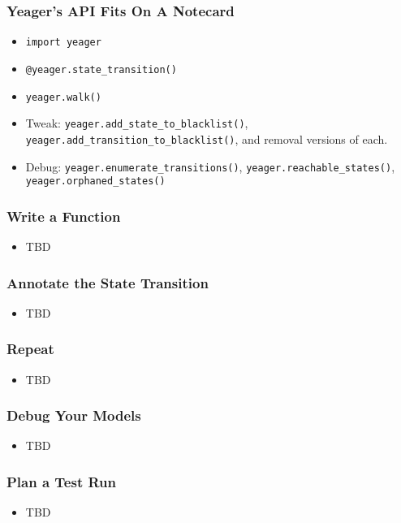 \begin{frame}
  \frametitle{Yeager's API Fits On A Notecard}
  \begin{itemize}
    \item \texttt{import yeager}
    \item \texttt{@yeager.state\_transition()}
    \item \texttt{yeager.walk()}
    \item Tweak: \texttt{yeager.add\_state\_to\_blacklist()}, \texttt{yeager.add\_transition\_to\_blacklist()}, and removal versions of each.
    \item Debug: \texttt{yeager.enumerate\_transitions()}, \texttt{yeager.reachable\_states()}, \texttt{yeager.orphaned\_states()}
  \end{itemize}
\end{frame}

\begin{frame}
  \frametitle{Write a Function}
  \begin{itemize}
    \item TBD
  \end{itemize}
\end{frame}

\begin{frame}
  \frametitle{Annotate the State Transition}
  \begin{itemize}
    \item TBD
  \end{itemize}
\end{frame}

\begin{frame}
  \frametitle{Repeat}
  \begin{itemize}
    \item TBD
  \end{itemize}
\end{frame}

\begin{frame}
  \frametitle{Debug Your Models}
  \begin{itemize}
    \item TBD
  \end{itemize}
\end{frame}

\begin{frame}
  \frametitle{Plan a Test Run}
  \begin{itemize}
    \item TBD
  \end{itemize}
\end{frame}

